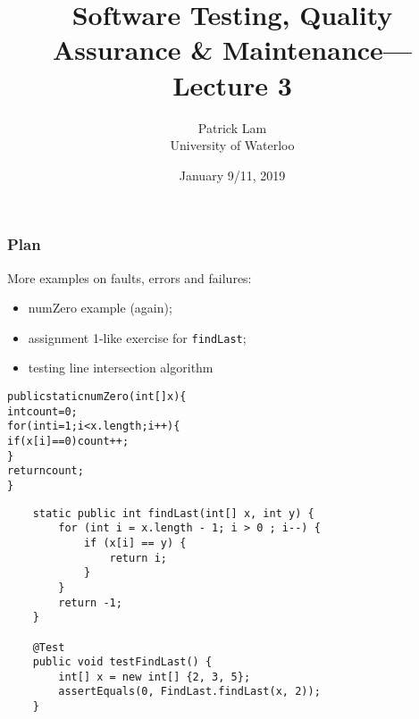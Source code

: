 \documentclass{beamer}
\title{Software Testing, Quality Assurance \& Maintenance---Lecture 3}
\author{Patrick Lam\\University of Waterloo}
\date{January 9/11, 2019}
\newenvironment{changemargin}[1]{%
  \begin{list}{}{%
    \setlength{\topsep}{0pt}%
    \setlength{\leftmargin}{#1}%
    \setlength{\rightmargin}{1em}
    \setlength{\listparindent}{\parindent}%
    \setlength{\itemindent}{\parindent}%
    \setlength{\parsep}{\parskip}%
  }%
  \item[]}{\end{list}}
\begin{document}
\begin{frame}
  \titlepage
\end{frame}

\begin{frame}
  \frametitle{Plan}

  \begin{changemargin}{2cm}
  More examples on faults, errors and failures:
  \begin{itemize}
  \item numZero example (again);
  \item assignment 1-like exercise for {\tt findLast};
  \item testing line intersection algorithm
  \end{itemize}
  \end{changemargin}
\end{frame}
  
\begin{frame}

  \begin{changemargin}{2em}

\begin{alltt}
public static numZero(int[] x) \{ \\
\quad int count = 0; \\
\quad for (int i = 1; i < x.length; i++) \{ \\
\qquad if (x[i] == 0) count++; \\
\quad \} \\
\quad return count;\\
\}
\end{alltt}
  \end{changemargin}

\end{frame}

\begin{frame}[fragile]

    \begin{lstlisting}
    static public int findLast(int[] x, int y) {
        for (int i = x.length - 1; i > 0 ; i--) {
            if (x[i] == y) {
                return i;
            }
        }
        return -1;
    }

    @Test
    public void testFindLast() {
        int[] x = new int[] {2, 3, 5};
        assertEquals(0, FindLast.findLast(x, 2));
    }
    \end{lstlisting}
  
\end{frame}
\end{document}
